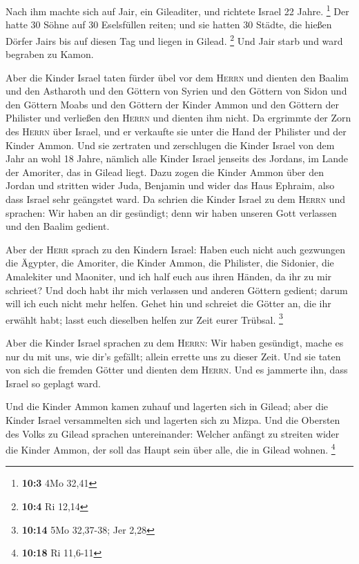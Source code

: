  Nach ihm machte sich auf Jair, ein Gileaditer, und
richtete Israel 22 Jahre. \footnote{\textbf{10:3} 4Mo 32,41}
 Der hatte 30 Söhne auf 30 Eselsfüllen reiten; und sie
hatten 30 Städte, die hießen Dörfer Jairs bis auf diesen Tag und liegen
in Gilead. \footnote{\textbf{10:4} Ri 12,14}  Und Jair
starb und ward begraben zu Kamon.

 Aber die Kinder Israel taten fürder übel vor dem
\textsc{Herrn} und dienten den Baalim und den Astharoth und den Göttern
von Syrien und den Göttern von Sidon und den Göttern Moabs und den
Göttern der Kinder Ammon und den Göttern der Philister und verließen den
\textsc{Herrn} und dienten ihm nicht.  Da ergrimmte der
Zorn des \textsc{Herrn} über Israel, und er verkaufte sie unter die Hand
der Philister und der Kinder Ammon.  Und sie zertraten und
zerschlugen die Kinder Israel von dem Jahr an wohl 18 Jahre, nämlich
alle Kinder Israel jenseits des Jordans, im Lande der Amoriter, das in
Gilead liegt.  Dazu zogen die Kinder Ammon über den Jordan
und stritten wider Juda, Benjamin und wider das Haus Ephraim, also dass
Israel sehr geängstet ward.  Da schrien die Kinder Israel
zu dem \textsc{Herrn} und sprachen: Wir haben an dir gesündigt; denn wir
haben unseren Gott verlassen und den Baalim gedient.

 Aber der \textsc{Herr} sprach zu den Kindern Israel:
Haben euch nicht auch gezwungen die Ägypter, die Amoriter, die Kinder
Ammon, die Philister,  die Sidonier, die Amalekiter und
Maoniter, und ich half euch aus ihren Händen, da ihr zu mir schrieet?
 Und doch habt ihr mich verlassen und anderen Göttern
gedient; darum will ich euch nicht mehr helfen.  Gehet
hin und schreiet die Götter an, die ihr erwählt habt; lasst euch
dieselben helfen zur Zeit eurer Trübsal. \footnote{\textbf{10:14} 5Mo
  32,37-38; Jer 2,28}

 Aber die Kinder Israel sprachen zu dem \textsc{Herrn}:
Wir haben gesündigt, mache es nur du mit uns, wie dir's gefällt; allein
errette uns zu dieser Zeit.  Und sie taten von sich die
fremden Götter und dienten dem \textsc{Herrn}. Und es jammerte ihn, dass
Israel so geplagt ward.

 Und die Kinder Ammon kamen zuhauf und lagerten sich in
Gilead; aber die Kinder Israel versammelten sich und lagerten sich zu
Mizpa.  Und die Obersten des Volks zu Gilead sprachen
untereinander: Welcher anfängt zu streiten wider die Kinder Ammon, der
soll das Haupt sein über alle, die in Gilead wohnen. \footnote{\textbf{10:18}
  Ri 11,6-11}

